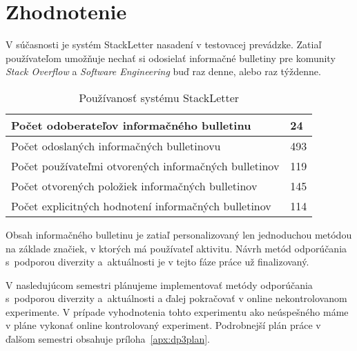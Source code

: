 \newpage

\chapter{Zhodnotenie}

V súčasnosti je systém StackLetter nasadení v testovacej prevádzke. Zatiaľ používateľom umožňuje nechať si odosielať
informačné bulletiny pre komunity \textit{Stack Overflow} a \textit{Software Engineering} buď raz denne, alebo raz týždenne.

\begin{table}[h]
\centering
\caption{Používanosť systému StackLetter}
\begin{tabular}{|m{10cm}|m{1.5cm}|}
\hline
Počet odoberateľov informačného bulletinu & 24 \\ \hline
Počet odoslaných informačných bulletinovu & 493 \\ \hline
Počet používateľmi otvorených informačných bulletinov & 119\footnotemark \\ \hline
Počet otvorených položiek informačných bulletinov & 145 \\ \hline
Počet explicitných hodnotení informačných bulletinov & 114 \\ \hline
\end{tabular}
\end{table}


Obsah informačného bulletinu je zatiaľ personalizovaný len jednoduchou metódou na základe značiek, v ktorých má používateľ aktivitu.
Návrh metód odporúčania s~podporou diverzity a~aktuálnosti je v tejto fáze práce už finalizovaný.

V nasledujúcom semestri plánujeme implementovať metódy odporúčania s~podporou diverzity a~aktuálnosti a ďalej pokračovať
v online nekontrolovanom experimente. V prípade vyhodnotenia tohto experimentu ako neúspešného máme v pláne vykonať
online kontrolovaný experiment. Podrobnejší plán práce v ďalšom semestri obsahuje príloha~\ref{apx:dp3plan}.
